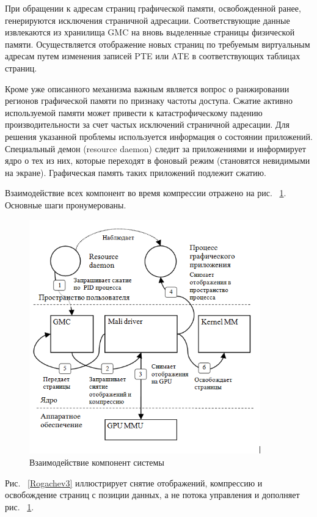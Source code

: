 \documentclass[10pt, a5paper]{article}
\begin{document}
При обращении к адресам страниц графической памяти, освобожденной ранее, генерируются исключения страничной адресации.  Соответствующие данные извлекаются из хранилища GMC на вновь выделенные страницы физической памяти. Осуществляется отображение новых страниц по требуемым виртуальным адресам путем изменения записей PTE или ATE в соответствующих таблицах страниц.

Кроме уже описанного механизма важным является вопрос о ранжировании регионов графической памяти по признаку частоты доступа. Сжатие активно используемой памяти может привести к катастрофическому падению производительности за счет частых исключений страничной адресации. Для решения указанной проблемы используется информация о состоянии приложений. Специальный демон (resource daemon) следит за приложениями и информирует ядро о тех из них, которые переходят в фоновый режим (становятся невидимыми на экране). Графическая память таких приложений подлежит сжатию.

Взаимодействие всех компонент во время компрессии отражено на рис. ~\ref{Rogachev2}. Основные шаги пронумерованы.

\begin{figure}[h!]
  \centering
  \includegraphics[width=10cm]{18_2016_Rogachev2.png}
  \caption{Взаимодействие компонент системы}
  \label{Rogachev2}
  
\end{figure}

Рис. ~\ref{Rogachev3} иллюстрирует снятие отображений, компрессию и освобождение страниц с позиции данных, а не потока управления и дополняет рис. ~\ref{Rogachev2}.
\end{document}
